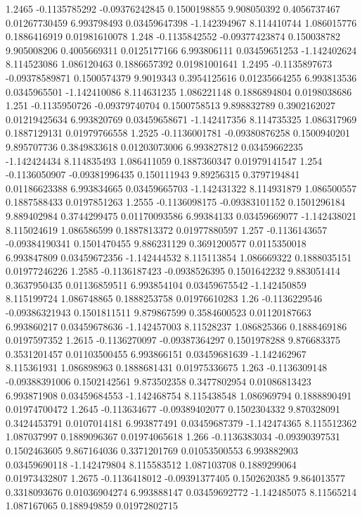 {1.2465 -0.1135785292 -0.09376242845 0.1500198855 9.908050392 0.4056737467 0.01267730459 6.993798493 0.03459647398 -1.142394967 8.114410744 1.086015776 0.1886416919 0.01981610078
1.248 -0.1135842552 -0.09377423874 0.150038782 9.905008206 0.4005669311 0.0125177166 6.993806111 0.03459651253 -1.142402624 8.114523086 1.086120463 0.1886657392 0.01981001641
1.2495 -0.1135897673 -0.09378589871 0.1500574379 9.9019343 0.3954125616 0.01235664255 6.993813536 0.0345965501 -1.142410086 8.114631235 1.086221148 0.1886894804 0.0198038686
1.251 -0.1135950726 -0.09379740704 0.1500758513 9.898832789 0.3902162027 0.01219425634 6.993820769 0.03459658671 -1.142417356 8.114735325 1.086317969 0.1887129131 0.01979766558
1.2525 -0.1136001781 -0.09380876258 0.1500940201 9.895707736 0.3849833618 0.01203073006 6.993827812 0.03459662235 -1.142424434 8.114835493 1.086411059 0.1887360347 0.01979141547
1.254 -0.1136050907 -0.09381996435 0.150111943 9.89256315 0.3797194841 0.01186623388 6.993834665 0.03459665703 -1.142431322 8.114931879 1.086500557 0.1887588433 0.0197851263
1.2555 -0.1136098175 -0.09383101152 0.1501296184 9.889402984 0.3744299475 0.01170093586 6.99384133 0.03459669077 -1.142438021 8.115024619 1.086586599 0.1887813372 0.01977880597
1.257 -0.1136143657 -0.09384190341 0.1501470455 9.886231129 0.3691200577 0.0115350018 6.993847809 0.03459672356 -1.142444532 8.115113854 1.086669322 0.1888035151 0.01977246226
1.2585 -0.1136187423 -0.0938526395 0.1501642232 9.883051414 0.3637950435 0.01136859511 6.993854104 0.03459675542 -1.142450859 8.115199724 1.086748865 0.1888253758 0.01976610283
1.26 -0.1136229546 -0.09386321943 0.1501811511 9.879867599 0.3584600523 0.01120187663 6.993860217 0.03459678636 -1.142457003 8.11528237 1.086825366 0.1888469186 0.0197597352
1.2615 -0.1136270097 -0.09387364297 0.1501978288 9.876683375 0.3531201457 0.01103500455 6.993866151 0.03459681639 -1.142462967 8.115361931 1.086898963 0.1888681431 0.01975336675
1.263 -0.1136309148 -0.09388391006 0.1502142561 9.873502358 0.3477802954 0.01086813423 6.993871908 0.03459684553 -1.142468754 8.115438548 1.086969794 0.1888890491 0.01974700472
1.2645 -0.113634677 -0.09389402077 0.1502304332 9.870328091 0.3424453791 0.0107014181 6.993877491 0.03459687379 -1.142474365 8.115512362 1.087037997 0.1889096367 0.01974065618
1.266 -0.1136383034 -0.09390397531 0.1502463605 9.867164036 0.3371201769 0.01053500553 6.993882903 0.03459690118 -1.142479804 8.115583512 1.087103708 0.1889299064 0.01973432807
1.2675 -0.1136418012 -0.09391377405 0.1502620385 9.864013577 0.3318093676 0.01036904274 6.993888147 0.03459692772 -1.142485075 8.11565214 1.087167065 0.188949859 0.01972802715
}

